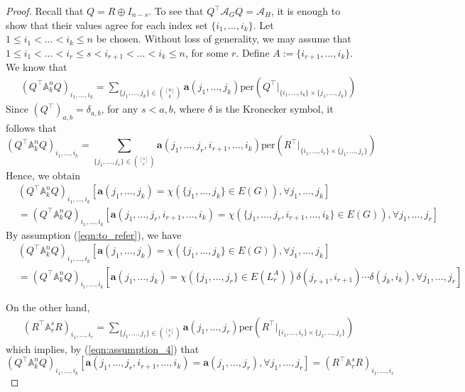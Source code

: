 \documentclass[12pt]{article}
\numberwithin{equation}{section}
\theoremstyle{definition}
\newcommand{\ev}[1]{( #1 )}
\newcommand{\ew}[1]{\left( #1 \right)}
\begin{document}
\begin{proof}
Recall that $Q = R\oplus I_{n-s}$. To see that $Q^\top \mathcal{A}_G Q = \mathcal{A}_H$, it is enough to show that their values agree for each index set $\{i_1,\ldots,i_k\}$. Let $1\leq i_1 < \ldots < i_k \leq n$ be chosen. Without loss of generality, we may assume that $1\leq i_1 < \ldots < i_r \leq s < i_{r+1} < \ldots < i_k \leq n$, for some $r$. Define $A:= \{ i_{r+1}, \ldots, i_{k}\}$. We know that
\begin{align*}
& (Q^\top \mathbb{A}^n_k Q)_{ i_1,\ldots,i_k } = \sum_{ \{ j_1,\ldots,j_k\} \in \binom{ [n] }{k} } \mathbf{a}\ev{j_1,\ldots,j_k}\mathrm{per}\ew{ Q^{\top}\big\vert_{ \{ i_1,\ldots,i_k\} \times \{ j_1,\ldots,j_k \} } } 
\end{align*}
Since $(Q^{\top})_{ a,b } = \delta_{a,b}$, for any $s<a,b$, where $\delta$ is the Kronecker symbol, it follows that
\begin{equation}
\label{eqn:assumption_4}
(Q^\top \mathbb{A}^n_k Q)_{ i_1,\ldots,i_k } =  \sum_{ \{ j_1,\ldots,j_r\} \in \binom{ [s] }{r} } \mathbf{a}\ev{j_1,\ldots, j_r, i_{r+1},\ldots ,i_k}\mathrm{per}\ew{ R^{\top}\big\vert_{ \{ i_1,\ldots,i_r\} \times \{ j_1,\ldots,j_r \} } } 
\end{equation}
Hence, we obtain
\begin{align*}
&(Q^\top \mathbb{A}^n_k Q)_{ i_1,\ldots,i_k }[ \mathbf{a}\ev{j_1,\ldots,j_k} = \chi\ev{ \{ j_1, \ldots, j_k \} \in E\ev{G} }, \forall j_1,\ldots,j_k ] \\
& =(Q^\top \mathbb{A}^n_k Q)_{ i_1,\ldots,i_k }
[\mathbf{a}\ev{j_1,\ldots,j_r,i_{r+1},\ldots,i_k} = \chi\ev{ \{ j_1,\ldots,j_r,i_{r+1},\ldots,i_k \} \in E\ev{G} }, \forall j_1,\ldots,j_r]
\end{align*}
By assumption (\ref{eqn:to_refer}), we have
\begin{align*}
&(Q^\top \mathbb{A}^n_k Q)_{ i_1,\ldots,i_k }[ \mathbf{a}\ev{j_1,\ldots,j_k} = \chi\ev{ \{ j_1, \ldots, j_k \} \in E\ev{G} }, \forall j_1,\ldots,j_k ] \\
& = (Q^\top \mathbb{A}^n_k Q)_{ i_1,\ldots,i_k } [ \mathbf{a}\ev{j_1,\ldots, j_k} = \chi\ev{ \{ j_1, \ldots, j_r \} \in E\ev{L_r^A} } \delta\ev{j_{r+1},i_{r+1}} \cdots  \delta\ev{j_{k},i_{k}}, \forall j_1,\ldots,j_r  ] 
\end{align*}

On the other hand, 
\begin{align*}
& \ev{ R^\top \mathbb{A}^{s}_r R }_{i_1,\ldots,i_r} = \sum_{ \{ j_1,\ldots,j_r\} \in \binom{ [s] }{r} } \mathbf{a}\ev{j_1,\ldots, j_r}\mathrm{per}\ew{ R^\top\big\vert_{ \{ i_1,\ldots,i_r\} \times \{ j_1,\ldots,j_r \} } } 
\end{align*}
which implies, by (\ref{eqn:assumption_4}) that
\begin{equation}
\label{eqn:assumption_3}
(Q^\top \mathbb{A}^n_k Q)_{ i_1,\ldots,i_k } [ \mathbf{a}\ev{j_1,\ldots, j_r, i_{r+1},\ldots ,i_k} = \mathbf{a}\ev{j_1,\ldots, j_r}, \forall j_1,\ldots,j_r  ] = \ev{ R^\top \mathbb{A}^{s}_r R }_{i_1,\ldots,i_r}
\end{equation}


\end{proof}
\end{document}
